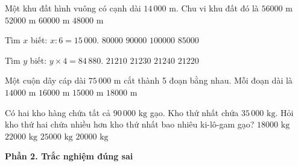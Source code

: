 \begin{ex} %
Một khu đất hình vuông có cạnh dài $14\,000\text{ m}$. Chu vi khu đất đó là
\choice
{\True $56000\text{ m}$}
{$52000\text{ m}$}
{$60000\text{ m}$}
{$48000\text{ m}$}
\end{ex}

\begin{ex} %
Tìm $x$ biết: $x : 6 = 15\,000$.
\choice
{$80000$}
{\True $90000$}
{$100000$}
{$85000$}
\end{ex}

\begin{ex} %
Tìm $y$ biết: $y \times 4 = 84\,880$.
\choice
{$21210$}
{$21230$}
{$21240$}
{\True $21220$}
\end{ex}

\begin{ex} %
Một cuộn dây cáp dài $75\,000\text{ m}$ cắt thành 5 đoạn bằng nhau. Mỗi đoạn dài là
\choice
{$14000\text{ m}$}
{$16000\text{ m}$}
{\True $15000\text{ m}$}
{$18000\text{ m}$}
\end{ex}

\begin{ex} %
Có hai kho hàng chứa tất cả $90\,000\text{ kg}$ gạo. Kho thứ nhất chứa $35\,000\text{ kg}$. Hỏi kho thứ hai chứa nhiều hơn kho thứ nhất bao nhiêu ki-lô-gam gạo?
\choice
{$18000\text{ kg}$}
{$22000\text{ kg}$}
{$25000\text{ kg}$}
{\True $20000\text{ kg}$}
\end{ex}

\textbf{Phần 2. Trắc nghiệm đúng sai}

